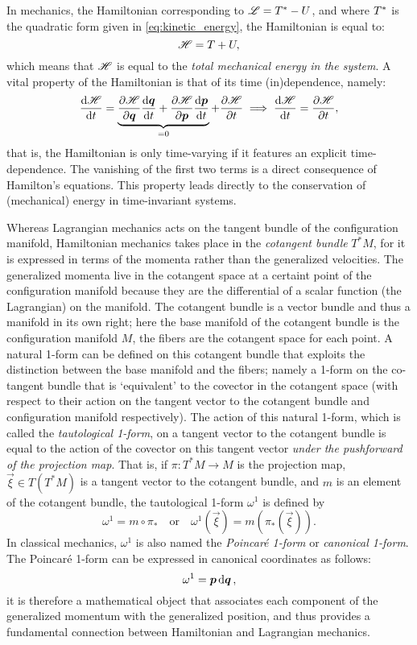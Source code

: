 In mechanics, the Hamiltonian corresponding to $\mathscr{L} = T^* - U$, and where $T^*$ is the quadratic form given in \cref{eq:kinetic_energy}, the Hamiltonian is equal to:
\begin{equation}
    \mathscr{H} = T + U,
\end{equation}
which means that $\mathscr{H}$ is equal to the \emph{total mechanical energy in the system}. A vital property of the Hamiltonian is that of its time (in)dependence, namely:
$$ 
\dv{\ensuremath{\mathscr{H}}}{t} = \underbrace{\pdv{\ensuremath{\mathscr{H}}}{\ensuremath{\vb*{q}}}\dv{\ensuremath{\vb*{q}}}{t} + \pdv{\ensuremath{\mathscr{H}}}{\ensuremath{\vb*{p}}}\dv{\ensuremath{\vb*{p}}}{t}}_{=0} + \pdv{\ensuremath{\mathscr{H}}}{t} \implies \dv{\ensuremath{\mathscr{H}}}{t} = \pdv{\ensuremath{\mathscr{H}}}{t},
$$
that is, the Hamiltonian is only time-varying if it features an explicit time-dependence. The vanishing of the first two terms is a direct consequence of Hamilton's equations. This property leads directly to the conservation of (mechanical) energy in time-invariant systems.

Whereas Lagrangian mechanics acts on the tangent bundle of the configuration manifold, Hamiltonian mechanics takes place in the \emph{cotangent bundle} $T^*M$, for it is expressed in terms of the momenta rather than the generalized velocities. The generalized momenta live in the cotangent space at a certaint point of the configuration manifold because they are the differential of a scalar function (the Lagrangian) on the manifold. The cotangent bundle is a vector bundle and thus a manifold in its own right; here the base manifold of the cotangent bundle is the configuration manifold $M$, the fibers are the cotangent space for each point. A natural 1-form can be defined on this cotangent bundle that exploits the distinction between the base manifold and the fibers; namely a 1-form on the co-tangent bundle that is `equivalent' to the covector in the cotangent space (with respect to their action on the tangent vector to the cotangent bundle and configuration manifold respectively). The action of this natural 1-form, which is called the \emph{tautological 1-form}, on a tangent vector to the cotangent bundle is equal to the action of the covector on this tangent vector \emph{under the pushforward of the projection map}. That is, if $\pi: T^*M \to M$ is the projection map, $\vec{\xi} \in T(T^*M)$ is a tangent vector to the cotangent bundle, and $m$ is an element of the cotangent bundle, the tautological 1-form $\omega^1$ is defined by \cite{Arnold1989,Abraham1978}
$$ \omega^1 = m\circ\pi_* \quad\text{or}\quad \omega^1(\vec{\xi}) = m(\pi_*(\vec{\xi})).  $$
In classical mechanics, $\omega^1$ is also named the \emph{Poincaré 1-form} or \emph{canonical 1-form}. The Poincaré 1-form can be expressed in canonical coordinates as follows:
$$ \omega^1 = \vb*{p}\dd{\ensuremath{\vb*{q}}}, $$
it is therefore a mathematical object that associates each component of the generalized momentum with the generalized position, and thus provides a fundamental connection between Hamiltonian and Lagrangian mechanics.

